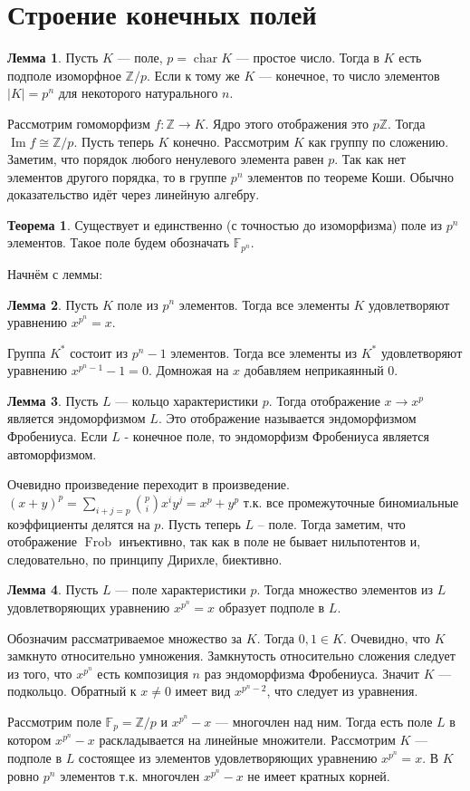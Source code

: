 \documentclass[10pt,a4paper,oneside]{book}
\theoremstyle{definition}
\newtheorem{thm}{{\color{red!40!black} Теорема}}
\newtheorem{lem}{Лемма}
\newcommand{\mb}[1]{\mathbb{#1}}
\newcommand{\chr}{\operatorname{char}}
\newcommand{\im}{\operatorname{Im}}
\newcommand{\Frob}{\operatorname{Frob}}
\def\thrm{\begin{thm}}
\def\ethrm{\end{thm}}
\def\lm{\begin{lem}}
\def\elm{\end{lem}}
\begin{document}
\section{Строение конечных полей}

\lm Пусть $K$ --- поле, $p=\chr K$ --- простое число. Тогда в $K$ есть подполе изоморфное $\mb Z/p$. Если к тому же $K$ --- конечное, то число элементов $|K|=p^n$ для некоторого натурального $n$. 
\elm
\proof Рассмотрим гомоморфизм $f\colon \mb Z \to K$. Ядро этого отображения это $p\mb Z$. Тогда $\im f\cong \mb Z/p$. Пусть теперь $K$ конечно. Рассмотрим $K$ как группу по сложению. Заметим, что порядок любого ненулевого элемента равен $p$. Так как нет элементов другого порядка, то в группе $p^n$ элементов по теореме Коши.
\endproof
Обычно доказательство идёт через линейную алгебру.


\thrm Существует и единственно (с точностью до изоморфизма) поле из $p^n$ элементов. Такое поле будем обозначать $\mb F_{p^n}$.
\ethrm

Начнём с леммы:
\lm Пусть $K$ поле из $p^n$ элементов. Тогда все элементы $K$ удовлетворяют уравнению $x^{p^n}=x$.
\elm
\proof Группа $K^*$ состоит из $p^n-1$ элементов. Тогда все элементы из $K^*$ удовлетворяют уравнению $x^{p^n-1}-1=0$. Домножая на $x$ добавляем неприкаянный 0.
\endproof


\lm Пусть $L$ --- кольцо характеристики $p$. Тогда отображение $x\to x^{p}$ является эндоморфизмом $L$. Это отображение называется эндоморфизмом Фробениуса. Если $L$ - конечное поле, то эндоморфизм Фробениуса является автоморфизмом. 
\elm
\proof Очевидно произведение переходит в произведение. $(x+y)^p=\sum_{i+j=p}{{p}\choose{i}} x^iy^j= x^p+y^p$ т.к. все промежуточные биномиальные коэффициенты делятся на $p$. Пусть теперь $L$ -- поле. Тогда заметим, что отображение $\Frob$ инъективно, так как в поле не бывает нильпотентов и, следовательно, по принципу Дирихле, биективно.
\endproof

\lm Пусть $L$ --- поле характеристики $p$. Тогда множество элементов из $L$ удовлетворяющих уравнению $x^{p^n}=x$ образует подполе в $L$.
\elm
\proof Обозначим рассматриваемое множество за $K$. Тогда $0,1\in K$. Очевидно, что $K$ замкнуто относительно умножения. Замкнутость относительно сложения следует из того, что $x^{p^n}$ есть композиция $n$ раз эндоморфизма Фробениуса. Значит $K$ --- подкольцо. Обратный к $x\neq 0$ имеет вид $x^{p^n-2}$, что следует из уравнения.
\endproof


Рассмотрим поле $\mb F_p=\mb Z/p$ и $x^{p^n}-x$ --- многочлен над ним. Тогда есть поле $L$ в котором   $x^{p^n}-x$ раскладывается на линейные множители. Рассмотрим $K$ --- подполе в $L$ состоящее из элементов удовлетворяющих уравнению $x^{p^n}=x$. В $K$ ровно $p^n$ элементов т.к. многочлен $x^{p^n}-x$ не имеет кратных корней.
\end{document}
